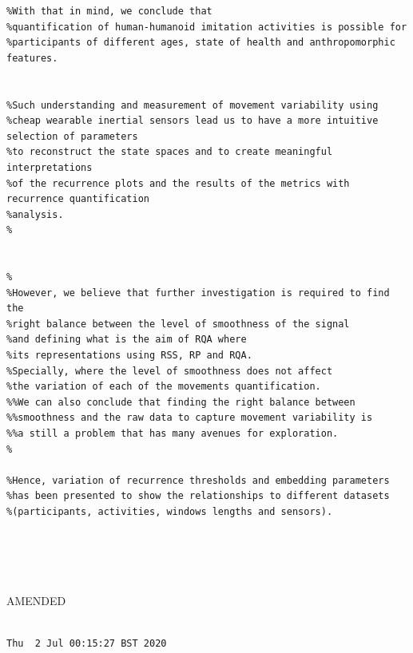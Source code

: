 \documentclass[10pt]{article}
\begin{document}
\begin{enumerate}
\begin{verbatim}
%With that in mind, we conclude that 
%quantification of human-humanoid imitation activities is possible for 
%participants of different ages, state of health and anthropomorphic features.


%Such understanding and measurement of movement variability using
%cheap wearable inertial sensors lead us to have a more intuitive selection of parameters
%to reconstruct the state spaces and to create meaningful interpretations
%of the recurrence plots and the results of the metrics with recurrence quantification 
%analysis. 
%


%
%However, we believe that further investigation is required to find the 
%right balance between the level of smoothness of the signal
%and defining what is the aim of RQA where 
%its representations using RSS, RP and RQA.
%Specially, where the level of smoothness does not affect 
%the variation of each of the movements quantification. 
%%We can also conclude that finding the right balance between 
%%smoothness and the raw data to capture movement variability is 
%%a still a problem that has many avenues for exploration.
%

%Hence, variation of recurrence thresholds and embedding parameters 
%has been presented to show the relationships to different datasets 
%(participants, activities, windows lengths and sensors).





\end{verbatim}
AMENDED
\begin{verbatim}

Thu  2 Jul 00:15:27 BST 2020

\end{verbatim}
\end{enumerate}
\end{document}
